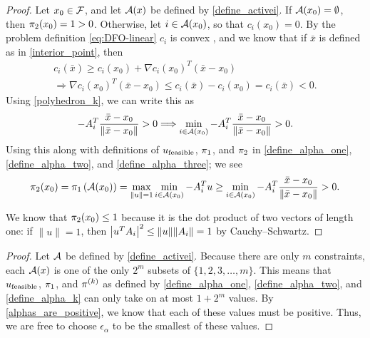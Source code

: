 \begin{proof}
Let $x_0 \in {\mathcal F}$, and let ${\mathcal A}(x)$ be defined by \cref{define_activei}.
If ${\mathcal A}(x_0) = \emptyset$, then $\pi_2(x_0) = 1 > 0$.
Otherwise, let $i \in {\mathcal A}(x_0)$, so that $c_i(x_0) = 0$.
By the  problem definition \cref{eq:DFO-linear} $c_i$ is convex , and we know that if $\bar x$ is defined as in \cref{interior_point}, then
\begin{align*}
c_i(\bar x) \ge c_i(x_0) + \nabla c_i(x_0)^T(\bar x - x_0) \\
\Longrightarrow \nabla c_i(x_0)^T(\bar x - x_0) \le c_i(\bar x) - c_i(x_0) = c_i(\bar x) < 0.
\end{align*}
Using \cref{polyhedron_k}, we can write this as
\begin{align*}
-{{A}}^T_i\frac {\bar x - x_0}{\|\bar x - x_0\|} > 0  \Longrightarrow \min_{i \in {\mathcal A}(x_0)} -{{A}}_i^T\frac {\bar x - x_0}{\|\bar x - x_0\|} > 0.
\end{align*}
Using this along with definitions of ${u_{\textrm{feasible}}}$, ${\pi_1}$, and $\pi_2$ in \cref{define_alpha_one}, \cref{define_alpha_two}, and \cref{define_alpha_three}; we see
\begin{align*}
\pi_2(x_0) = {\pi_1}\left({\mathcal A}(x_0)\right) = \max_{\|u\| = 1} \min_{i \in {\mathcal A}(x_0)} -{{A}}_i^Tu
\ge \min_{i \in {\mathcal A}(x_0)} - {{A}}_i^T\frac {\bar x - x_0}{\|\bar x - x_0\|} > 0.
\end{align*}

We know that $\pi_2(x_0) \le 1$ because it is the dot product of two vectors of length one:
if $\|u\| = 1$, then $\left|u^T {{A}}_i\right|^2 \le \|u\|\|{{A}}_i\| = 1$ by Cauchy–Schwartz.

\end{proof}

\begin{proof}
Let ${\mathcal A}$ be defined by \cref{define_activei}.
Because there are only $m$ constraints, each ${\mathcal A}(x)$ is one of the only $2^m$ subsets of  $\{1, 2, 3, \ldots, m\}$.
This means that ${u_{\textrm{feasible}}}$, ${\pi_1}$, and $\pi^{(k)}$ as defined by \cref{define_alpha_one}, \cref{define_alpha_two}, and \cref{define_alpha_k} can only take on at most $1 + 2^m$ values.
By \cref{alphas_are_positive}, we know that each of these values must be positive.
Thus, we are free to choose $\epsilon_{\alpha}$ to be the smallest of these values.
\end{proof}

